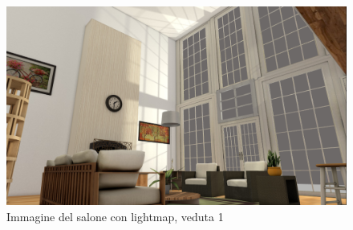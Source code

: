 \begin{figure}[htb]
 \centering
 \includegraphics[width=1\linewidth]{images/chapter_prove_sperimentali/salone_vetrata_bake.png}\hfill
 \caption[Salone con lightmap, veduta 1]{Immagine del salone con lightmap, veduta 1}
 \label{fig:prove_sperimentali_navigatore_vetrata_bake}
\end{figure}

